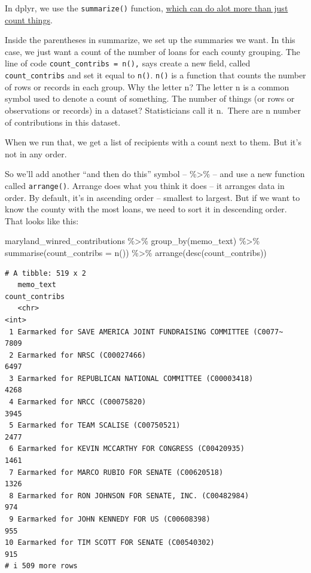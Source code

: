 \documentclass[
  letterpaper,
  DIV=11,
  numbers=noendperiod]{scrreprt}
\newenvironment{Shaded}{\begin{snugshade}}{\end{snugshade}}
\newcommand{\AttributeTok}[1]{\textcolor[rgb]{0.40,0.45,0.13}{#1}}
\newcommand{\FunctionTok}[1]{\textcolor[rgb]{0.28,0.35,0.67}{#1}}
\newcommand{\NormalTok}[1]{\textcolor[rgb]{0.00,0.23,0.31}{#1}}
\newcommand{\SpecialCharTok}[1]{\textcolor[rgb]{0.37,0.37,0.37}{#1}}
\begin{document}
In dplyr, we use the \texttt{summarize()} function,
\href{http://dplyr.tidyverse.org/reference/summarise.html}{which can do
alot more than just count things}.

Inside the parentheses in summarize, we set up the summaries we want. In
this case, we just want a count of the number of loans for each county
grouping. The line of code \texttt{count\_contribs\ =\ n(),} says create
a new field, called \texttt{count\_contribs} and set it equal to
\texttt{n()}. \texttt{n()} is a function that counts the number of rows
or records in each group. Why the letter n? The letter n is a common
symbol used to denote a count of something. The number of things (or
rows or observations or records) in a dataset? Statisticians call it
n.~There are n number of contributions in this dataset.

When we run that, we get a list of recipients with a count next to them.
But it's not in any order.

So we'll add another ``and then do this'' symbol -- \%\textgreater\% --
and use a new function called \texttt{arrange()}. Arrange does what you
think it does -- it arranges data in order. By default, it's in
ascending order -- smallest to largest. But if we want to know the
county with the most loans, we need to sort it in descending order. That
looks like this:

\begin{Shaded}
\begin{Highlighting}[]
\NormalTok{maryland\_winred\_contributions }\SpecialCharTok{\%\textgreater{}\%}
  \FunctionTok{group\_by}\NormalTok{(memo\_text) }\SpecialCharTok{\%\textgreater{}\%}
  \FunctionTok{summarise}\NormalTok{(}\AttributeTok{count\_contribs =} \FunctionTok{n}\NormalTok{()) }\SpecialCharTok{\%\textgreater{}\%}
  \FunctionTok{arrange}\NormalTok{(}\FunctionTok{desc}\NormalTok{(count\_contribs))}
\end{Highlighting}
\end{Shaded}

\begin{verbatim}
# A tibble: 519 x 2
   memo_text                                                      count_contribs
   <chr>                                                                   <int>
 1 Earmarked for SAVE AMERICA JOINT FUNDRAISING COMMITTEE (C0077~           7809
 2 Earmarked for NRSC (C00027466)                                           6497
 3 Earmarked for REPUBLICAN NATIONAL COMMITTEE (C00003418)                  4268
 4 Earmarked for NRCC (C00075820)                                           3945
 5 Earmarked for TEAM SCALISE (C00750521)                                   2477
 6 Earmarked for KEVIN MCCARTHY FOR CONGRESS (C00420935)                    1461
 7 Earmarked for MARCO RUBIO FOR SENATE (C00620518)                         1326
 8 Earmarked for RON JOHNSON FOR SENATE, INC. (C00482984)                    974
 9 Earmarked for JOHN KENNEDY FOR US (C00608398)                             955
10 Earmarked for TIM SCOTT FOR SENATE (C00540302)                            915
# i 509 more rows
\end{verbatim}
\end{document}
